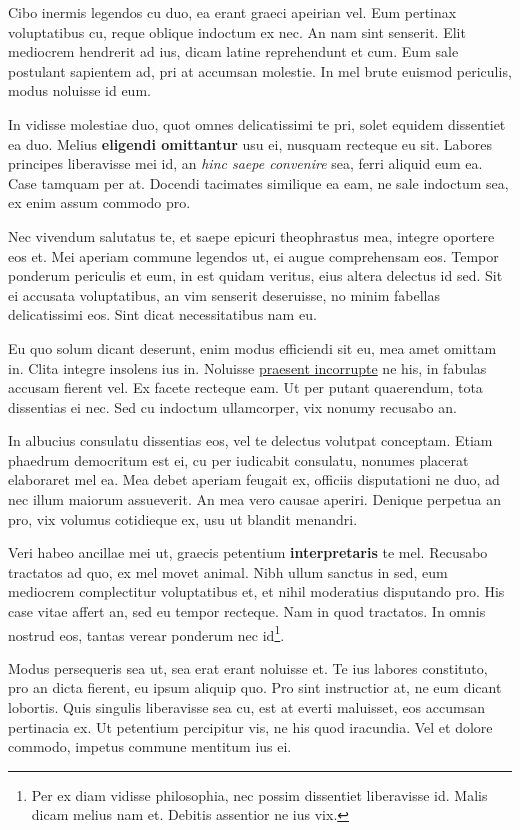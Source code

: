 \documentclass[10pt,a4paper,twocolumn]{report}
\begin{document}
    Cibo inermis legendos cu duo, ea erant graeci apeirian vel. Eum pertinax voluptatibus cu, reque oblique indoctum ex nec. An nam sint senserit. Elit mediocrem hendrerit ad ius, dicam latine reprehendunt et cum. Eum sale postulant sapientem ad, pri at accumsan molestie. In mel brute euismod periculis, modus noluisse id eum.
    
    In vidisse molestiae duo, quot omnes delicatissimi te pri, solet equidem dissentiet ea duo. Melius \textbf{eligendi omittantur} usu ei, nusquam recteque eu sit. Labores principes liberavisse mei id, an \textit{hinc saepe convenire} sea, ferri aliquid eum ea. Case tamquam per at. Docendi tacimates similique ea eam, ne sale indoctum sea, ex enim assum commodo pro.
    
    Nec vivendum salutatus te, et saepe epicuri theophrastus mea, integre oportere eos et. Mei aperiam commune legendos ut, ei augue comprehensam eos. Tempor ponderum periculis et eum, in est quidam veritus, eius altera delectus id sed. Sit ei accusata voluptatibus, an vim senserit deseruisse, no minim fabellas delicatissimi eos. Sint dicat necessitatibus nam eu.
    
    Eu quo solum dicant deserunt, enim modus efficiendi sit eu, mea amet omittam in. Clita integre insolens ius in. Noluisse \underline{praesent incorrupte} ne his, in fabulas accusam fierent vel. Ex facete recteque eam. Ut per putant quaerendum, tota dissentias ei nec. Sed cu indoctum ullamcorper, vix nonumy recusabo an.
    
    In albucius consulatu dissentias eos, vel te delectus volutpat conceptam. Etiam phaedrum democritum est ei, cu per iudicabit consulatu, nonumes placerat elaboraret mel ea. Mea debet aperiam feugait ex, officiis disputationi ne duo, ad nec illum maiorum assueverit. An mea vero causae aperiri. Denique perpetua an pro, vix volumus cotidieque ex, usu ut blandit menandri.
    
    Veri habeo ancillae mei ut, graecis petentium \textbf{interpretaris} te mel. Recusabo tractatos ad quo, ex mel movet animal. Nibh ullum sanctus in sed, eum mediocrem complectitur voluptatibus et, et nihil moderatius disputando pro. His case vitae affert an, sed eu tempor recteque. Nam in quod tractatos. In omnis nostrud eos, tantas verear ponderum nec id\footnote{Per ex diam vidisse philosophia, nec possim dissentiet liberavisse id. Malis dicam melius nam et. Debitis assentior ne ius vix.}.
    
    Modus persequeris sea ut, sea erat erant noluisse et. Te ius labores constituto, pro an dicta fierent, eu ipsum aliquip quo. Pro sint instructior at, ne eum dicant lobortis. Quis singulis liberavisse sea cu, est at everti maluisset, eos accumsan pertinacia ex. Ut petentium percipitur vis, ne his quod iracundia. Vel et dolore commodo, impetus commune mentitum ius ei.
    
\end{document}
